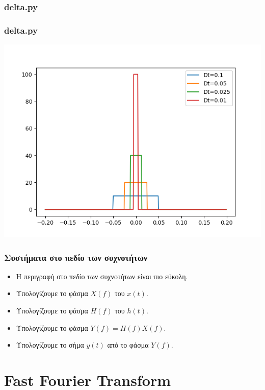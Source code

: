 \documentclass[9pt]{beamer}
\begin{document}
	\begin{frame}
		\frametitle{delta.py}
				
	\end{frame}

	\begin{frame}
	\frametitle{delta.py}
	\centering
	\includegraphics[width=0.7\linewidth]{delta}
	\end{frame}
	
	
	\begin{frame}
		\frametitle{Συστήματα στο πεδίο των συχνοτήτων}
		\begin{itemize}
			\item Η περιγραφή στο πεδίο των συχνοτήτων είναι πιο εύκολη.
			\item Υπολογίζουμε το φάσμα $X(f)$ του $x(t)$.
			\item Υπολογίζουμε το φάσμα $H(f)$ του $h(t)$.
			\item Υπολογίζουμε το φάσμα $Y(f)=H(f)X(f)$.
			\item Υπολογίζουμε το σήμα $y(t)$ από το φάσμα $Y(f)$.			
		\end{itemize}
	\end{frame}
	
	\section{Fast Fourier Transform}
	
\end{document}
